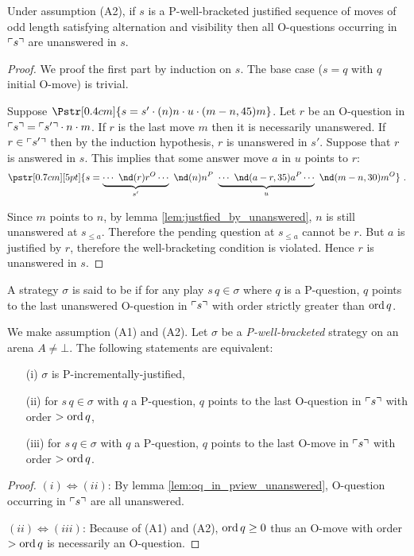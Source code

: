 \begin{lemma}
\label{lem:oq_in_pview_unanswered}
Under assumption (A2), if $s$ is a P-well-bracketed justified sequence of moves of odd length satisfying alternation and visibility then  all O-questions occurring in $\ulcorner s \urcorner$ are unanswered in $s$.
\end{lemma}
\begin{proof}
We proof the first part by induction on $s$.
The base case ($s = q$ with $q$ initial O-move) is trivial.

Suppose $\Pstr[0.4cm]{ s = s' \cdot (n)n \cdot u \cdot (m-n,45){m} }$.
Let $r$ be an O-question in $\ulcorner s \urcorner = \ulcorner s' \urcorner \cdot n \cdot m$.
If $r$ is the last move $m$ then it is necessarily unanswered.
If $r \in \ulcorner s' \urcorner$ then by the induction hypothesis, $r$ is unanswered in $s'$.
Suppose that $r$ is answered in $s$. This implies that some answer move $a$ in $u$ points to $r$:
$$\pstr[0.7cm][5pt]{ s = \underbrace{\cdots\ \nd(r){r}^O \cdots }_{s'} \
\nd(n){n}^P \ \underbrace{\cdots\ \nd(a-r,35){a}^P \cdots }_{u} \
\nd(m-n,30){m}^O } \ .$$

Since $m$ points to $n$, by lemma \ref{lem:justfied_by_unanswered}, $n$ is still unanswered at $s_{\leq a}$. Therefore the pending
question at $s_{\leq a}$ cannot be $r$. But $a$ is justified by $r$, therefore the well-bracketing condition is violated. Hence $r$ is
unanswered in $s$.
\end{proof}





\begin{definition}\rm
  A strategy $\sigma$ is said to be \defname{P-incrementally
    justified} if for any play $s \, q \in \sigma$ where $q$ is a
  P-question, $q$ points to the last unanswered O-question in $\ulcorner s \urcorner$ with
  order strictly greater than $\mathop{\mathrm{ord}}{q}$.
\end{definition}

\begin{proposition}
\label{prop:char_pincr}
\rm We make assumption (A1) and (A2).
Let $\sigma$ be a \emph{P-well-bracketed} strategy on an arena $A\neq \bot$.
The following statements are equivalent:
\begin{enumerate}
\item[(i)] $\sigma$ is P-incrementally-justified,
\item[(ii)] for $s \, q \in \sigma$ with $q$ a P-question, $q$ points to the last O-question in $\ulcorner s \urcorner$ with order $>\mathop{\mathrm{ord}}{q}$,
\item[(iii)] for $s \, q \in \sigma$ with $q$ a P-question, $q$ points to the last O-move in $\ulcorner s \urcorner$ with order $>\mathop{\mathrm{ord}}{q}$.
\end{enumerate}
\end{proposition}
\begin{proof}
$(i)\iff(ii)$: By lemma \ref{lem:oq_in_pview_unanswered}, O-question occurring in $\ulcorner s \urcorner$ are all unanswered.

$(ii)\iff(iii)$: Because of (A1) and (A2), $\mathop{\mathrm{ord}}{q} \geq 0$ thus an O-move with order $>\mathop{\mathrm{ord}}{q}$ is necessarily an O-question.
\end{proof}

